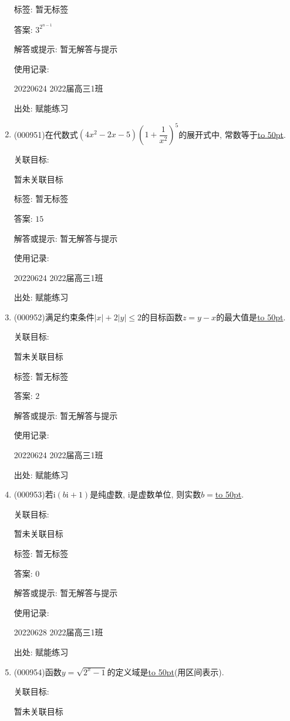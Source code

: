 \documentclass[10pt,a4paper]{article}
\newcommand{\blank}[1]{\underline{\hbox to #1pt{}}}
\begin{document}
\begin{enumerate}[1.]
标签: 暂无标签

答案: $3^{2^{n-1}}$

解答或提示: 暂无解答与提示

使用记录:

20220624	2022届高三1班	


出处: 赋能练习
\item { (000951)}在代数式$(4x^2-2x-5)(1+\dfrac1{x^2})^5$的展开式中, 常数等于\blank{50}.


关联目标:

暂未关联目标



标签: 暂无标签

答案: $15$

解答或提示: 暂无解答与提示

使用记录:

20220624	2022届高三1班	


出处: 赋能练习
\item { (000952)}满足约束条件$|x|+2|y|\le 2 $的目标函数$z=y-x$的最大值是\blank{50}.


关联目标:

暂未关联目标



标签: 暂无标签

答案: $2$

解答或提示: 暂无解答与提示

使用记录:

20220624	2022届高三1班	


出处: 赋能练习
\item { (000953)}若$\mathrm{i}(b\mathrm{i}+1)$是纯虚数, $\mathrm{i}$是虚数单位, 则实数$b=$\blank{50}.


关联目标:

暂未关联目标



标签: 暂无标签

答案: $0$

解答或提示: 暂无解答与提示

使用记录:

20220628	2022届高三1班	


出处: 赋能练习
\item { (000954)}函数$y=\sqrt{2^x-1}$的定义域是\blank{50}(用区间表示).


关联目标:

暂未关联目标




\end{enumerate}
\end{document}
